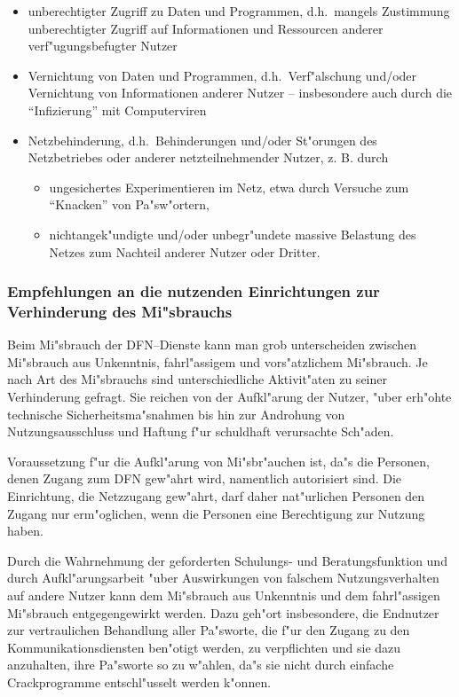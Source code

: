 \documentclass[12pt,titlepage,twoside]{scrartcl}
\begin{document}
\begin{appendix}
\begin{itemize}
  \item unberechtigter Zugriff zu Daten und Programmen, d.h.\  mangels
    Zustimmung unberechtigter Zugriff auf Informationen und Ressourcen
    anderer verf"ugungsbefugter Nutzer
  \item Vernichtung von Daten und Programmen, d.h.\  Verf"alschung und/oder
    Vernichtung von Informationen anderer Nutzer -- insbesondere auch durch
    die "`Infizierung"' mit Computerviren
  \item Netzbehinderung, d.h.\  Behinderungen und/oder St"orungen des
    Netzbetriebes oder anderer netzteilnehmender Nutzer, z. B. durch
    \begin{itemize}
      \item ungesichertes Experimentieren im Netz, etwa durch Versuche zum
        "`Knacken"' von Pa"sw"ortern,
      \item nichtangek"undigte und/oder unbegr"undete massive Belastung des
        Netzes zum Nachteil anderer Nutzer oder Dritter.
    \end{itemize}
\end{itemize}

\subsubsection{Empfehlungen an die nutzenden Einrichtungen zur Verhinderung des
Mi"sbrauchs}

Beim Mi"sbrauch der DFN--Dienste kann man grob unterscheiden zwischen
Mi"sbrauch aus Unkenntnis, fahrl"assigem und vors"atzlichem Mi"sbrauch. Je nach
Art des Mi"sbrauchs sind unterschiedliche Aktivit"aten zu seiner Verhinderung
gefragt. Sie reichen von der Aufkl"arung der Nutzer, "uber erh"ohte technische
Sicherheitsma"snahmen bis hin zur Androhung von Nutzungsausschluss und Haftung
f"ur schuldhaft verursachte Sch"aden.

Voraussetzung f"ur die Aufkl"arung von Mi"sbr"auchen ist, da"s die Personen,
denen Zugang zum DFN gew"ahrt wird, namentlich autorisiert sind. Die
Einrichtung, die Netzzugang gew"ahrt, darf daher nat"urlichen Personen den
Zugang nur erm"oglichen, wenn die Personen eine Berechtigung zur Nutzung
haben.

Durch die Wahrnehmung der geforderten Schulungs- und Beratungsfunktion und
durch Aufkl"arungsarbeit "uber Auswirkungen von falschem Nutzungsverhalten auf
andere Nutzer kann dem Mi"sbrauch aus Unkenntnis und dem fahrl"assigen
Mi"sbrauch entgegengewirkt werden. Dazu geh"ort insbesondere, die Endnutzer
zur vertraulichen Behandlung aller Pa"sworte, die f"ur den Zugang zu den
Kommunikationsdiensten ben"otigt werden, zu verpflichten und sie dazu
anzuhalten, ihre Pa"sworte so zu w"ahlen, da"s sie nicht durch einfache
Crackprogramme entschl"usselt werden k"onnen.


\end{appendix}
\end{document}

